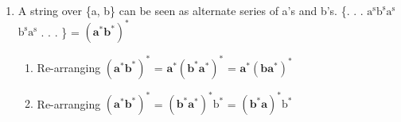 \begin{enumerate}
\begin{myTableStyle}
\begin{tabular}{ |m{4cm}|m{1cm}|m{10cm}| }
    \end{tabular} \end{myTableStyle} \vspace{0.08in}

    \item A string over \{a, b\} can be seen as alternate series of a's and b's.
    \{. . . \(\text{a}^\text{s}\)\(\text{b}^\text{s}\)\(\text{a}^\text{s}\)\(\text{b}^\text{s}\)\(\text{a}^\text{s}\) . . . \}
    = \( \mathbf { (\text{a}^*\text{b}^*)^*} \)
    \begin{enumerate}
        \item Re-arranging \( \mathbf { (\text{a}^*\text{b}^*)^*} \)
          = \( \mathbf { \text{a}^*(\text{b}^*\text{a}^*)^*} \)
          = \( \mathbf { \text{a}^*(\text{b}\text{a}^*)^*} \)

        \item Re-arranging \( \mathbf { (\text{a}^*\text{b}^*)^*} \)
          = \( \mathbf { (\text{b}^*\text{a}^*)^*}\text{b}^* \)
          = \( \mathbf { (\text{b}^*\text{a})^*}\text{b}^* \)
    \end{enumerate}


\end{enumerate}
